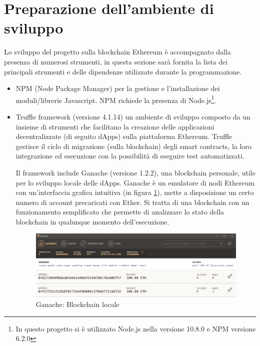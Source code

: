 \section{Preparazione dell'ambiente di sviluppo}

Lo sviluppo del progetto sulla blockchain Ethereum è accompagnato dalla presenza di numerosi strumenti, in questa sezione sarà fornita la lista dei principali strumenti e delle dipendenze utilizzate durante la programmazione.

\begin{itemize}
\item NPM (Node Package Manager) per la gestione e l'installazione dei moduli/librerie Javascript. NPM richiede la presenza di Node.js\footnote{In questo progetto si è utilizzato Node.js nella versione 10.8.0 e NPM versione 6.2.0}.

\item Truffle framework (versione 4.1.14) un ambiente di sviluppo composto da un insieme di strumenti che facilitano la creazione delle applicazioni decentralizzate (di seguito dApps) sulla piattaforma Ethereum. Truffle gestisce il ciclo di migrazione (sulla blockchain) degli smart contracts, la loro integrazione ed esecuzione con la possibilità di eseguire test automatizzati.

Il framework include Ganache (versione 1.2.2), una blockchain personale, utile per lo sviluppo locale delle dApps. Ganache è un emulatore di nodi Ethereum con un'interfaccia grafica intuitiva (in figura {\ref{fig:ganache}}), mette a disposizione un certo numero di account precaricati con Ether. Si tratta di una blockchain con un funzionamento semplificato che permette di analizzare lo stato della blockchain in qualunque momento dell'esecuzione.

\begin{figure}[H]
\centering
\includegraphics[width=1\textwidth]{immagini/ganache-window.png}
\caption{Ganache: Blockchain locale}
\label{fig:ganache}
\end{figure}


\end{itemize}
